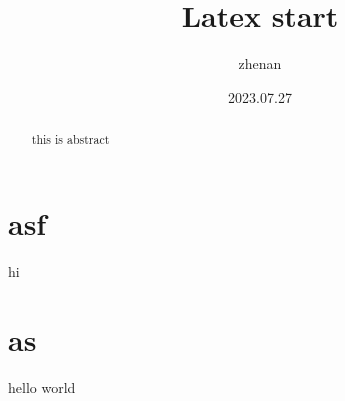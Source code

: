 \documentclass{article}
\author{ zhenan }
\date{2023.07.27}
\title{Latex start}
\begin{document}
\maketitle
\begin{center}
\end{center}

\tableofcontents %

\tableofcontents

\begin{abstract}
this is abstract
\end{abstract}

\section{asf}
hi

\section{as}
hello world



\end{document}
